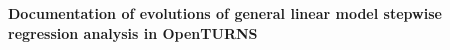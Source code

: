 %

\vspace*{2cm}

\begin{center}
  {\huge \bf Documentation of evolutions of general linear model stepwise regression analysis in OpenTURNS}
  
\end{center}

